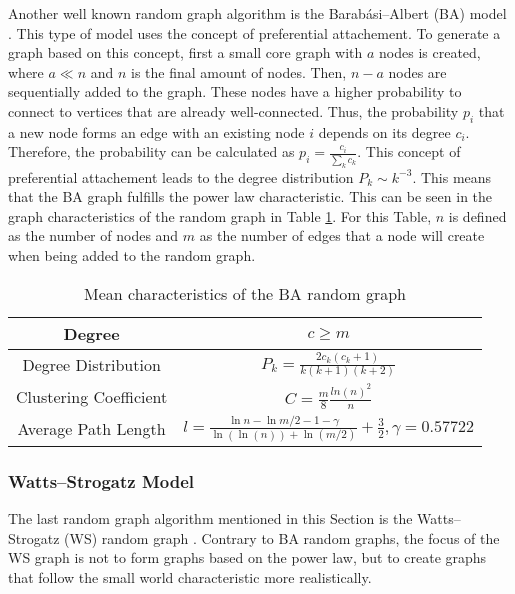 Another well known random graph algorithm is the Barabási–Albert (BA) model 
\cite{barabasimodel}. 
This type of model uses the concept of preferential attachement.
To generate a graph based on this concept, first a small \glqq core\grqq{}
graph with $a$ nodes is created, where $a\ll n$ and $n$ is the final amount of nodes.
Then, $n-a$ nodes are sequentially added to the graph.
These nodes have a higher 
probability to connect to vertices that are already well-connected. 
Thus, the probability $p_i$ that a new node forms an edge with an
existing node $i$ depends on its degree $c_i$. Therefore, the
probability can be calculated as $p_i= \frac{c_i}{\sum_{k}c_k}$.
This concept of preferential attachement leads to the degree distribution
$P_k\sim k^{-3}$. This means that the BA graph 
fulfills the power law characteristic.
This can be seen in the graph characteristics of the random graph
in Table \ref{ba-model}. For this Table, $n$ is defined as the number
of nodes and $m$ as the number of edges that a node
will create when being added to the random graph.

\begin{table}[ht!]
    \centering
    \begin{tabular}{|c | c |} 
     \hline
     Degree & $c\geq m$ \\ 
     \hline
     Degree Distribution & 
     $P_k = \frac{2c_k(c_k+1)}{k(k+1)(k+2)}$ \\ 
     \hline
     Clustering Coefficient \cite{ba_cluster_coeff} & 
     $C=\frac{m}{8}\frac{ln(n)^2}{n}$ \\ 
     \hline
     Average Path Length \cite{averagepath}& 
     $l = \frac{\ln{n}- \ln{m/2} - 1 - \gamma}{\ln(\ln(n))+\ln{(m/2)}} + \frac{3}{2}, 
     \gamma=0.57722$ \\ 
     \hline
    \end{tabular}
    \caption{Mean characteristics of the BA random graph \cite{basicnetwork}}
    \label{ba-model}
\end{table}

\subsubsection{Watts–Strogatz Model}
The last random graph algorithm mentioned in this Section 
is the Watts–Strogatz (WS) random graph \cite{wattsmodel}.
Contrary to BA random graphs, the focus of the WS graph is not to 
form graphs based on the power law, but to create graphs
that follow the small world characteristic more realistically.

